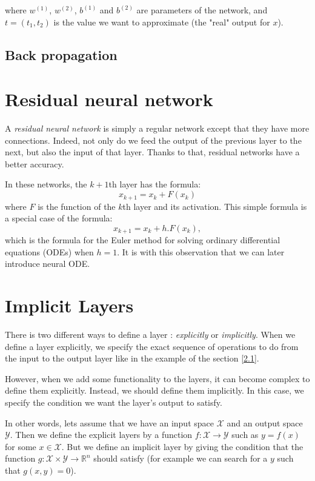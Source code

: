 \documentclass[10pt,a4paper]{article}
\theoremstyle{definition}
\theoremstyle{theorem}
\begin{document}
where $w^{(1)}$, $w^{(2)}$, $b^{(1)}$ and $b^{(2)}$ are parameters of the network, and $t = (t_1, t_2)$ is the value we want to approximate (the "real" output for $x$). 

\subsection{Back propagation}

\section{Residual neural network} \label{rnn}

A \textit{residual neural network} is simply a regular network except that they have more connections. Indeed, not only do we feed the output of the previous layer to the next, but also the input of that layer. Thanks to that, residual networks have a better accuracy. 

In these networks, the $k+1$th layer has the formula:
\[
x_{k+1} = x_k + F(x_k)
\]
where $F$ is the function of the $k$th layer and its activation. This simple formula is a special case of the formula:
\[
x_{k+1} = x_k + h.F(x_k),
\]
which is the formula for the Euler method for solving ordinary differential equations (ODEs) when $h = 1$. It is with this observation that we can later introduce neural ODE.

\section{Implicit Layers}

There is two different ways to define a layer : \textit{explicitly} or \textit{implicitly}. When we define a layer explicitly, we specify the exact sequence of operations to do from the input to the output layer like in the example of the section \ref{2.1}. 

However, when we add some functionality to the layers, it can become complex to define them explicitly. Instead, we should define them implicitly. In this case, we specify the condition we want the layer's output to satisfy. 

In other words, lets assume that we have an input space $\mathcal{X}$ and an output space $\mathcal{Y}$. Then we define the explicit layers by a function $f : \mathcal{X} \rightarrow \mathcal{Y}$ such as $y = f(x)$ for some $x \in \mathcal{X}$. But we define an implicit layer by giving the condition that the function $g: \mathcal{X} \times \mathcal{Y} \rightarrow \mathbb{R}^n$ should satisfy (for example we can search for a $y$ such that $g(x,y) = 0$).
\end{document}
